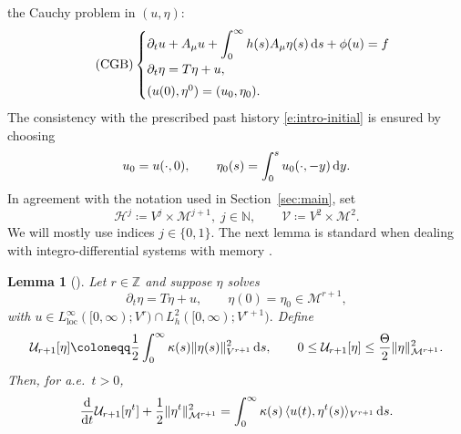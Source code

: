 \documentclass[12pt,leqno]{amsart}
\def\d{{\rm d}}
\def\loc {{\mathrm{loc}}}
\def\pt {{\partial_t}}
\newtheorem{lemma}[theorem]{Lemma}
\theoremstyle{definition}
\numberwithin{equation}{section}
\numberwithin{figure}{section}
\begin{document}
the Cauchy problem in $(u,\eta)$:
\begin{equation}\label{eq:CG-QC} \tag{CGB}
\begin{cases}
\pt u + A_{\mu}u + \displaystyle\int_{0}^{\infty}h(s)A_{\mu}\eta(s)\,\d s + \phi(u)
= f \\[2mm]
\pt \eta = T\eta + u,\\[1mm]
(u(0),\eta^{0})=(u_{0},\eta_{0}).
\end{cases}
\end{equation}
The consistency with the prescribed past history \eqref{e:intro-initial} is ensured by choosing
\begin{equation}\label{eq:initial-history}
u_{0}=u(\cdot,0),\qquad \eta_{0}(s)=\int_{0}^{s}u_{0}(\cdot,-y)\,\d y.
\end{equation}
In agreement with the notation used in Section~\ref{sec:main},  set
\begin{equation}\label{eq:phase-spaces}
\mathcal H^{j}\coloneqq {V^j}\times{\mathcal M^{j+1}}, \;j\in \mathbb N,
\qquad
\mathcal V\coloneqq {V^2}\times{\mathcal M^{2}}.
\end{equation}
We will mostly use indices $j\in \{0,1\}.$ The next lemma is standard when dealing with integro-differential systems with memory .
 
\begin{lemma}[\cite{CGDP2010}]\label{lem:memory-tail} 
Let $r\in \mathbb Z$ and suppose $\eta$ solves
\[
\pt\eta = T\eta + u,\qquad \eta(0)=\eta_0\in{\mathcal M^{r+1}},
\]
with
$
u\in L^\infty_{\loc}([0,\infty);V^r)\cap L^2_{h}([0,\infty);{V^{r+1}}).
$
Define 
\begin{equation}\label{eq:U-tail-def}
\mathcal U_{r+1}[\eta]\coloneqq \frac12 \int_0^\infty \kappa(s)\|\eta(s)\|_{{V^{r+1}}}^2\,\d s, \qquad  
0\le \mathcal U_{r+1}[\eta]\le \frac{\Theta}{2}\|\eta\|_{{\mathcal M^{r+1}}}^2.
\end{equation}
 Then, for a.e.\ $t>0$,
\begin{equation}\label{eq:U-tail-identity}
\frac{\d}{\d t}\mathcal U_{r+1}[\eta^t] + \frac12\|\eta^t\|_{{\mathcal M^{r+1}}}^2
= \int_0^\infty \kappa(s)\,\langle u(t),\eta^t(s)\rangle_{{V^{r+1}}}\,\d s.
\end{equation}


\end{lemma}
\end{document}
